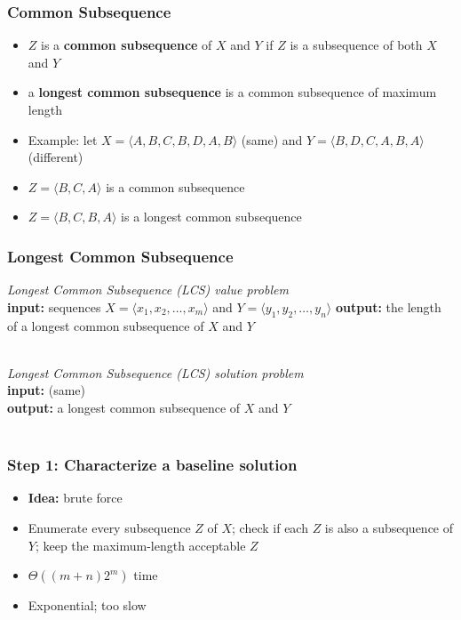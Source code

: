 \documentclass{beamer}
\newcommand{\stanza}{ \\~\ }
\begin{document}
\begin{frame} \frametitle{Common Subsequence}
  \begin{itemize}
  \item $Z$ is a \textbf{common subsequence} of $X$ and $Y$ if $Z$ is a subsequence of both $X$ and $Y$
  \item a \textbf{longest common subsequence} is a common subsequence of maximum length
  \item Example: let $X=\langle A, B, C, B, D, A, B \rangle $ (same) and $Y=\langle B, D, C, A, B, A \rangle$ (different)
  \item $Z=\langle B, C, A \rangle$ is a common subsequence
  \item $Z=\langle B, C, B, A \rangle$ is a longest common subsequence
  \end{itemize}
\end{frame}

\begin{frame} \frametitle{Longest Common Subsequence}

  \emph{Longest Common Subsequence (LCS) value problem} \\
  \textbf{input:} sequences $X=\langle x_1, x_2, \ldots, x_m \rangle$ and $Y=\langle y_1, y_2, \ldots, y_n \rangle$
  \textbf{output:} the length of a longest common subsequence of $X$ and $Y$ \stanza

  \emph{Longest Common Subsequence (LCS) solution problem} \\
  \textbf{input:} (same) \\
  \textbf{output:} a longest common subsequence of $X$ and $Y$ \stanza
  
\end{frame}

\begin{frame} \frametitle{Step 1: Characterize a baseline solution}
  \begin{itemize}
  \item \textbf{Idea:} brute force
  \item Enumerate every subsequence $Z$ of $X$; check if each $Z$ is also a subsequence of $Y$; keep the maximum-length acceptable $Z$
  \item $\Theta((m+n)2^m)$ time
  \item Exponential; too slow
  \end{itemize}
\end{frame}    
\end{document}
